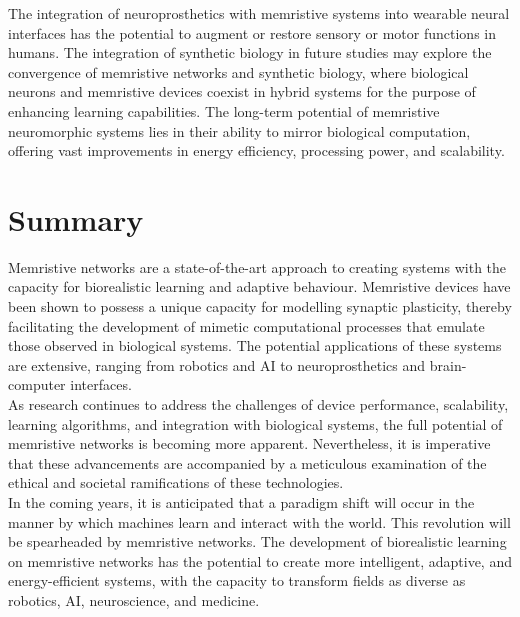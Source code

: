 \noindent The integration of neuroprosthetics with memristive systems into wearable neural interfaces has the potential to augment or restore sensory or motor functions in humans. The integration of synthetic biology in future studies may explore the convergence of memristive networks and synthetic biology, where biological neurons and memristive devices coexist in hybrid systems for the purpose of enhancing learning capabilities. The long-term potential of memristive neuromorphic systems lies in their ability to mirror biological computation, offering vast improvements in energy efficiency, processing power, and scalability.

\section[Summary]{Summary}

\noindent Memristive networks are a state-of-the-art approach to creating systems with the capacity for biorealistic learning and adaptive behaviour. Memristive devices have been shown to possess a unique capacity for modelling synaptic plasticity, thereby facilitating the development of mimetic computational processes that emulate those observed in biological systems. The potential applications of these systems are extensive, ranging from robotics and AI to neuroprosthetics and brain-computer interfaces.\\

\noindent As research continues to address the challenges of device performance, scalability, learning algorithms, and integration with biological systems, the full potential of memristive networks is becoming more apparent. Nevertheless, it is imperative that these advancements are accompanied by a meticulous examination of the ethical and societal ramifications of these technologies.\\

\noindent In the coming years, it is anticipated that a paradigm shift will occur in the manner by which machines learn and interact with the world. This revolution will be spearheaded by memristive networks. The development of biorealistic learning on memristive networks has the potential to create more intelligent, adaptive, and energy-efficient systems, with the capacity to transform fields as diverse as robotics, AI, neuroscience, and medicine.